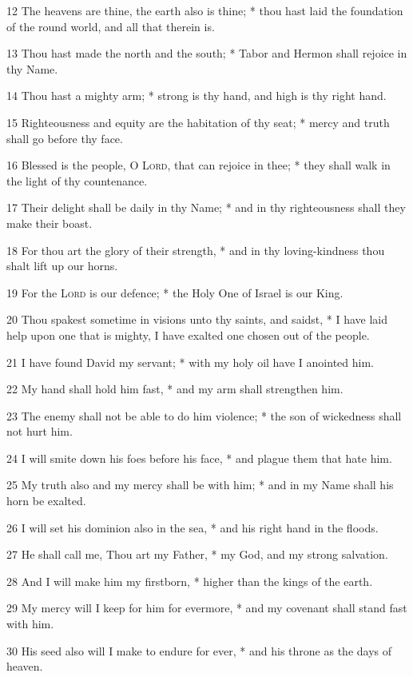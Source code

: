 12 The heavens are thine, the earth also is thine; * thou hast laid the foundation of the round world, and all that therein is.\par
13 Thou hast made the north and the south; * Tabor and Hermon shall rejoice in thy Name.\par
14 Thou hast a mighty arm; * strong is thy hand, and high is thy right hand.\par
15 Righteousness and equity are the habitation of thy seat; * mercy and truth shall go before thy face.\par
16 Blessed is the people, O {\textsc{Lord}}, that can rejoice in thee; * they shall walk in the light of thy countenance.\par
17 Their delight shall be daily in thy Name; * and in thy righteousness shall they make their boast.\par
18 For thou art the glory of their strength, * and in thy loving-kindness thou shalt lift up our horns.\par
19 For the {\textsc{Lord}} is our defence; * the Holy One of Israel is our King.\par
20 Thou spakest sometime in visions unto thy saints, and saidst, * I have laid help upon one that is mighty, I have exalted one chosen out of the people.\par
21 I have found David my servant; * with my holy oil have I anointed him.\par
22 My hand shall hold him fast, * and my arm shall strengthen him.\par
23 The enemy shall not be able to do him violence; * the son of wickedness shall not hurt him.\par
24 I will smite down his foes before his face, * and plague them that hate him.\par
25 My truth also and my mercy shall be with him; * and in my Name shall his horn be exalted.\par
26 I will set his dominion also in the sea, * and his right hand in the floods.\par
27 He shall call me, Thou art my Father, * my God, and my strong salvation.\par
28 And I will make him my firstborn, * higher than the kings of the earth.\par
29 My mercy will I keep for him for evermore, * and my covenant shall stand fast with him.\par
30 His seed also will I make to endure for ever, * and his throne as the days of heaven.\par
